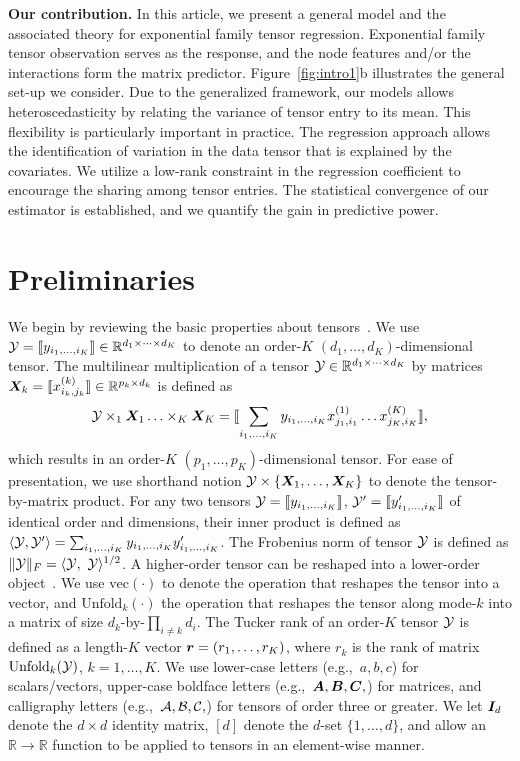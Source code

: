\documentclass[12pt]{article}
\theoremstyle{plain}
\theoremstyle{definition}
\begin{document}
{\bf Our contribution.} In this article, we present a general model and the associated theory for exponential family tensor regression. Exponential family tensor observation serves as the response, and the node features and/or the interactions form the matrix predictor. Figure~\ref{fig:intro1}b illustrates the general set-up we consider. Due to the generalized framework, our models allows heteroscedasticity by relating the variance of tensor entry to its mean. This ﬂexibility is particularly important in practice.  The regression approach allows the identiﬁcation of variation in the data tensor that is explained by the covariates. We utilize a low-rank constraint in the regression coeﬃcient to encourage the sharing among tensor entries. The statistical convergence of our estimator is established, and we quantify the gain in predictive power. 


\section{Preliminaries}

We begin by reviewing the basic properties about tensors~\citep{kolda2009tensor}. We use $\mathcal{Y}=\llbracket y_{i_1,\ldots,i_K} \rrbracket\in \mathbb{R}^{d_1\times \cdots\times d_K}$ to denote an order-$K$ $(d_1,\ldots,d_K)$-dimensional tensor. The multilinear multiplication of a tensor $\mathcal{Y}\in\mathbb{R}^{d_1\times \cdots\times d_K}$ by matrices $\bm X_k=\llbracket x_{i_k,j_k}^{(k)} \rrbracket\in\mathbb{R}^{p_k\times d_k}$ is defined as
\begin{equation}
\mathcal{Y} \times_1\bm X_1\ldots \times_K \bm X_K=\llbracket \sum_{i_1,\ldots,i_K}y_{i_1,\ldots,i_K}x_{j_1,i_1}^{(1)}\ldots x_{j_K,i_K}^{(K)} \rrbracket,
\end{equation}
which results in an order-$K$ $(p_1,\ldots,p_K)$-dimensional tensor. For ease of presentation, we use shorthand notion $\mathcal{Y}\times\{\bm X_1,\ldots,\bm X_K\}$ to denote the tensor-by-matrix product. For any two tensors $\mathcal{Y}=\llbracket y_{i_1,\ldots,i_K} \rrbracket$, $\mathcal{Y}'=\llbracket y'_{i_1,\ldots,i_K} \rrbracket$ of identical order and dimensions, their inner product is defined as $\langle \mathcal{Y}, \mathcal{Y}'\rangle =\sum_{i_1,\ldots,i_K}y_{i_1,\ldots,i_K}y'_{i_1,\ldots,i_K}$. The Frobenius norm of tensor $\mathcal{Y}$ is defined as $\FnormSize{}{\tY}=\langle \tY,\ \tY \rangle^{1/2}$. A higher-order tensor can be reshaped into a lower-order object~\citep{wang2017operator}. We use $\text{vec}(\cdot)$ to denote the operation that reshapes the tensor into a vector, and $\text{Unfold}_k(\cdot)$ the operation that reshapes the tensor along mode-$k$ into a matrix of size $d_k$-by-$\prod_{i\neq k}d_i$. The Tucker rank of an order-$K$ tensor $\mathcal{Y}$ is defined as a length-$K$ vector $\bm{r}=(r_1,\ldots,r_K)$, where $r_k$ is the rank of matrix $\text{Unfold}_k(\mathcal{Y})$, $k=1,\ldots,K$. We use lower-case letters (e.g.,\ $a,b,c$) for scalars/vectors, upper-case boldface letters (e.g.,\ $\bm A,\bm B,\bm C,$) for matrices, and calligraphy letters (e.g.,\ $\mathcal{A}, \mathcal{B}, \mathcal{C},$) for tensors of order three or greater. We let $\bm I_d$ denote the $d \times d$ identity matrix, $[d]$ denote the $d$-set $\{1,\ldots,d\}$, and allow an $\mathbb{R}\to \mathbb{R}$ function to be applied to tensors in an element-wise manner. 
\end{document}
